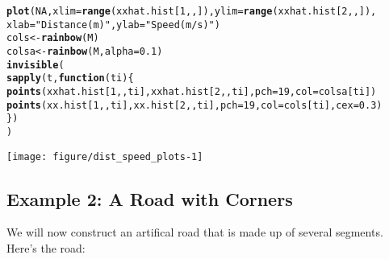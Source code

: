 \documentclass[11pt]{article}\usepackage[]{graphicx}\usepackage[]{color}
\makeatletter
\def\maxwidth{ %
  \ifdim\Gin@nat@width>\linewidth
    \linewidth
  \else
    \Gin@nat@width
  \fi
}
\newcommand{\hlnum}[1]{\textcolor[rgb]{0.686,0.059,0.569}{#1}}%
\newcommand{\hlstr}[1]{\textcolor[rgb]{0.192,0.494,0.8}{#1}}%
\newcommand{\hlstd}[1]{\textcolor[rgb]{0.345,0.345,0.345}{#1}}%
\newcommand{\hlkwa}[1]{\textcolor[rgb]{0.161,0.373,0.58}{\textbf{#1}}}%
\newcommand{\hlkwb}[1]{\textcolor[rgb]{0.69,0.353,0.396}{#1}}%
\newcommand{\hlkwc}[1]{\textcolor[rgb]{0.333,0.667,0.333}{#1}}%
\newcommand{\hlkwd}[1]{\textcolor[rgb]{0.737,0.353,0.396}{\textbf{#1}}}%
\newenvironment{kframe}{%
 \def\at@end@of@kframe{}%
 \ifinner\ifhmode%
  \def\at@end@of@kframe{\end{minipage}}%
  \begin{minipage}{\columnwidth}%
 \fi\fi%
 \def\FrameCommand##1{\hskip\@totalleftmargin \hskip-\fboxsep
 \colorbox{shadecolor}{##1}\hskip-\fboxsep
     \hskip-\linewidth \hskip-\@totalleftmargin \hskip\columnwidth}%
 \MakeFramed {\advance\hsize-\width
   \@totalleftmargin\z@ \linewidth\hsize
   \@setminipage}}%
 {\par\unskip\endMakeFramed%
 \at@end@of@kframe}
\newenvironment{knitrout}{}{} %
\makeatother
\begin{document}
\begin{knitrout}
\color{fgcolor}\begin{kframe}
\begin{alltt}
\hlkwd{plot}\hlstd{(}\hlnum{NA}\hlstd{,} \hlkwc{xlim} \hlstd{=} \hlkwd{range}\hlstd{(xxhat.hist[}\hlnum{1}\hlstd{,,]),} \hlkwc{ylim} \hlstd{=} \hlkwd{range}\hlstd{(xxhat.hist[}\hlnum{2}\hlstd{,,]),}
     \hlkwc{xlab} \hlstd{=} \hlstr{"Distance (m)"}\hlstd{,} \hlkwc{ylab} \hlstd{=} \hlstr{"Speed (m/s)"}\hlstd{)}
\hlstd{cols} \hlkwb{<-} \hlkwd{rainbow}\hlstd{(M)}
\hlstd{colsa} \hlkwb{<-} \hlkwd{rainbow}\hlstd{(M,} \hlkwc{alpha} \hlstd{=} \hlnum{0.1}\hlstd{)}
\hlkwd{invisible}\hlstd{(}
    \hlkwd{sapply}\hlstd{(t,} \hlkwa{function}\hlstd{(}\hlkwc{ti}\hlstd{) \{}
               \hlkwd{points}\hlstd{(xxhat.hist[}\hlnum{1}\hlstd{,,ti], xxhat.hist[}\hlnum{2}\hlstd{,,ti],} \hlkwc{pch} \hlstd{=} \hlnum{19}\hlstd{,} \hlkwc{col} \hlstd{= colsa[ti])}
               \hlkwd{points}\hlstd{(xx.hist[}\hlnum{1}\hlstd{,,ti], xx.hist[}\hlnum{2}\hlstd{,,ti],} \hlkwc{pch} \hlstd{=} \hlnum{19}\hlstd{,} \hlkwc{col} \hlstd{= cols[ti],} \hlkwc{cex} \hlstd{=} \hlnum{0.3}\hlstd{)}
           \hlstd{\})}
    \hlstd{)}
\end{alltt}
\end{kframe}

{\centering \texttt{[image: figure/dist\_speed\_plots-1]} 

}



\end{knitrout}



\subsection{Example 2: A Road with Corners}

We will now construct an artifical road that is made up of several segments. Here's the road:
\end{document}
